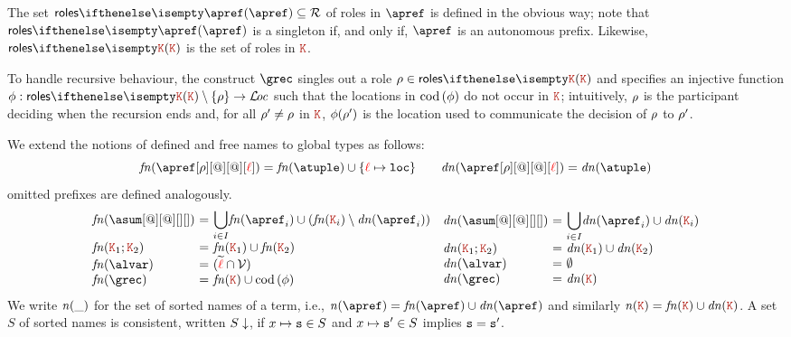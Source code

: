 The set $\roles \apref \subseteq \roleset$ of roles in $\apref$ is
defined in the obvious way; note that $\roles \apref$ is a singleton
if, and only if, $\apref$ is an autonomous prefix.
%
Likewise, $\roles \aK$ is the set of roles in
$\aK$.

To handle recursive behaviour, the construct $\grec$ singles out a
role $\arole \in \roles \aK$ and specifies an injective function
$\aphi : \roles \aK \setminus \{\arole\} \to \locset$ such that the
locations in $\operatorname{cod} {(}\phi)$ do not occur in $\aK$; intuitively,
$\rho$ is the participant deciding when the recursion ends and, for
all $\rho' \neq \rho$ in $\aK$, $\phi(\rho')$ is the location
used to communicate the decision of $\rho$ to $\rho'$.

We extend the notions of defined and free names to global types as
follows:
\[
 \fn{\apref[\arole][@][@][\alocvar]}
 = \fn \atuple \cup \{\alocvar \mapsto \asort[loc]\} 
\qquad
 \dn{\apref[\arole][@][@][\alocvar]} 
 = \dn \atuple 
\]
omitted prefixes are defined analogously.
\[
  \begin{array}{ll}
    \begin{array}{l@{\ =\ } ll}
      \fn{\asum[@][@][][]} & \displaystyle{\bigcup_{i\in I}} \fn{\apref_i} \cup (\fn{\aK_i}\setminus\dn{\apref_i})
      \\
      \fn{\aK_1; \aK_2} 
                &
                  \fn{\aK_1}\cup\fn{\aK_2}
      \\
      \fn \alvar & (\seq \alocvar \cap \varset)
      \\
      \fn \grec & \fn {\aK} \cup \cod(\aphi)
    \end{array}
    \begin{array}{l@{\ =\ } ll}
      \dn{\asum[@][@][][]} & \displaystyle{\bigcup_{i\in I}} \dn{\apref_i} \cup \dn{\aK_i}
      \\
      \dn{\aK_1; \aK_2} 
                           &
                             \dn{\aK_1}\cup\dn{\aK_2}
      \\
      \dn \alvar & \emptyset
      \\
      \dn \grec & \dn {\aK}
    \end{array}
  \end{array}
\]
%
We write ${\it n}(\_)$ for the set of sorted names of a term, i.e.,
$\names \apref = \fn\apref \cup \dn\apref$ and similarly
$\names \aK = \fn\aK \cup \dn\aK$. A set $S$ of sorted names is
consistent, written $S\downarrow$, if $x\mapsto \mathtt{s} \in S$ and
$x\mapsto \mathtt{s}' \in S$ implies $\mathtt{s} = \mathtt{s}'$.
 
